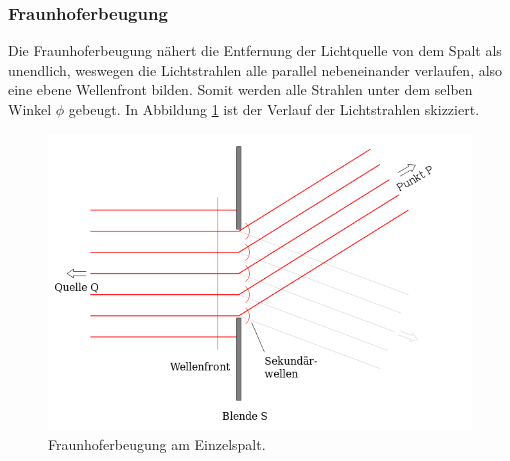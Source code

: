 \subsubsection*{Fraunhoferbeugung}
Die Fraunhoferbeugung nähert die Entfernung der Lichtquelle von dem Spalt als unendlich, weswegen die Lichtstrahlen alle parallel nebeneinander verlaufen, also
eine ebene Wellenfront bilden. Somit werden alle Strahlen unter dem selben Winkel $\phi$ gebeugt. In Abbildung \ref{fig:frauenhofer} ist der Verlauf der
Lichtstrahlen skizziert.
\begin{figure}[H]
    \centering
    \includegraphics[scale = 0.45]{pictures/frauenhofer.png}
    \caption{Fraunhoferbeugung am Einzelspalt. \cite{AP02}}
    \label{fig:frauenhofer}
\end{figure}
\noindent

